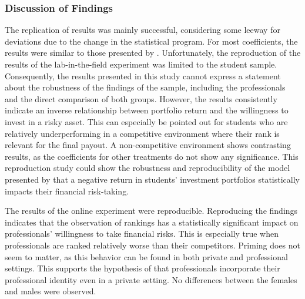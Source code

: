 \documentclass[12pt]{article}
\begin{document}
\subsubsection{Discussion of Findings} \label{subsubsection:discussion_findings} 
The replication of results was mainly successful, considering some leeway for deviations due to the change in the statistical program. For most coefficients, the results were similar to those presented by \textcite{Kirchler2018}. Unfortunately, the reproduction of the results of the lab-in-the-field experiment was limited to the student sample. Consequently, the results presented in this study cannot express a statement about the robustness of the findings of the sample, including the professionals and the direct comparison of both groups. However, the results consistently indicate an inverse relationship between portfolio return and the willingness to invest in a risky asset. This can especially be pointed out for students who are relatively underperforming in a competitive environment where their rank is relevant for the final payout. A non-competitive environment shows contrasting results, as the coefficients for other treatments do not show any significance. This reproduction study could show the robustness and reproducibility of the model presented by \textcite{Kirchler2018} that a negative return in students' investment portfolios statistically impacts their financial risk-taking. \par
The results of the online experiment were reproducible. Reproducing the findings indicates that the observation of rankings has a statistically significant impact on professionals' willingness to take financial risks. This is especially true when professionals are ranked relatively worse than their competitors. Priming does not seem to matter, as this behavior can be found in both private and professional settings. This supports the hypothesis of  \textcite{Kirchler2018} that professionals incorporate their professional identity even in a private setting. No differences between the females and males were observed. \
\end{document}
